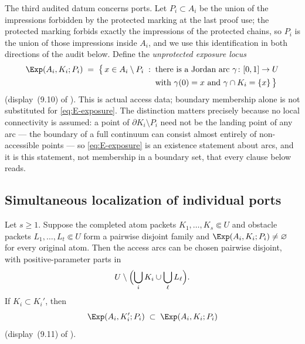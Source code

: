 The third audited datum concerns ports. Let $P_i\subset A_i$ be the union of the
impressions forbidden by the protected marking at the last proof use; the protected
marking forbids exactly the impressions of the protected chains, so $P_i$ is the
union of those impressions inside $A_i$, and we use this identification in both
directions of the audit below. Define the
\emph{unprotected exposure locus}
\begin{equation}\label{eq:E-exposure}
\begin{aligned}
\Exp(A_i,K_i;P_i)\;=\;
\bigl\{\,x\in A_i\setminus P_i \;:\;{}&
\text{there is a Jordan arc }\gamma\colon[0,1]\to U\\
&\text{with }\gamma(0)=x
\text{ and }\gamma\cap K_i=\{x\}\,\bigr\}
\end{aligned}
\end{equation}
(display~(9.10) of \cite{MWman}). This is actual access data; boundary membership
alone is not substituted for \eqref{eq:E-exposure}. The distinction matters
precisely because no local connectivity is assumed: a point of
$\partial K_i\setminus P_i$ need not be the landing point of any arc --- the
boundary of a full continuum can consist almost entirely of non-accessible points
\cite{Pom92} --- so \eqref{eq:E-exposure} is an existence statement about arcs, and
it is this statement, not membership in a boundary set, that every clause below
reads.

\subsection{Simultaneous localization of individual ports}\label{subsec:E-localization}

\begin{lemma}\label{lem:port-localization}
Let $s\ge1$.  Suppose the completed atom packets
$K_1,\dots,K_s\Subset U$ and obstacle packets
$L_1,\dots,L_t\Subset U$ form a pairwise disjoint family and
$\Exp(A_i,K_i;P_i)\neq\varnothing$ for every original atom. Then the access arcs can
be chosen pairwise disjoint, with positive-parameter parts in
\[
U\setminus\Bigl(\bigcup_{i}K_i\cup\bigcup_{\ell}L_\ell\Bigr).
\]
If $K_i\subset K_i'$, then
\begin{equation}\label{eq:E-exposure-monotone}
\Exp(A_i,K_i';P_i)\;\subset\;\Exp(A_i,K_i;P_i)
\end{equation}
(display~(9.11) of \cite{MWman}).
\end{lemma}

